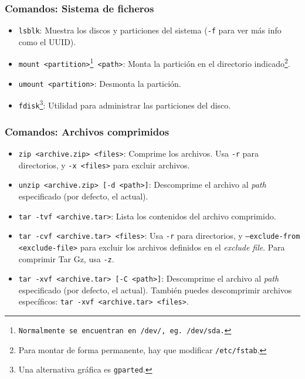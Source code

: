 \documentclass[aspectratio=43]{beamer}
\begin{document}
\begin{frame}
    \frametitle{Comandos: Sistema de ficheros}

    \begin{itemize}
        \item \texttt{lsblk}: Muestra los discos y particiones del sistema (\texttt{-f} para ver más info como el UUID).
        \item \texttt{mount <partition>\footnote{Normalmente se encuentran en \texttt{/dev/}, eg. \texttt{/dev/sda}.} <path>}: Monta la partición en el directorio indicado\footnote{Para montar de forma permanente, hay que modificar \texttt{/etc/fstab}.}.
        \item \texttt{umount <partition>}: Desmonta la partición. 
        \item \texttt{fdisk}\footnote{Una alternativa gráfica es \texttt{gparted}.}: Utilidad para administrar las particiones del disco.
    \end{itemize}

\end{frame}

\begin{frame}
    \frametitle{Comandos: Archivos comprimidos}

    \begin{itemize}
        \item \texttt{zip <archive.zip> <files>}: Comprime los archivos. Usa \texttt{-r} para directorios, y \texttt{-x <files>} para excluir archivos.
        \item  \texttt{unzip <archive.zip> [-d <path>]}: Descomprime el archivo al \textit{path} especificado (por defecto, el actual).
        \item  \texttt{tar -tvf <archive.tar>}: Lista los contenidos del archivo comprimido.
        \item \texttt{tar -cvf <archive.tar> <files>}: Usa \texttt{-r} para directorios, y \texttt{--exclude-from <exclude-file>} para excluir los archivos definidos en el \textit{exclude file}. Para comprimir Tar Gz, usa \texttt{-z}.
        \item \texttt{tar -xvf <archive.tar> [-C <path>]}: Descomprime el archivo al \textit{path} especificado (por defecto, el actual). También puedes descomprimir archivos específicos: \texttt{tar -xvf <archive.tar> <files>}.
    \end{itemize}

\end{frame}
\end{document}
